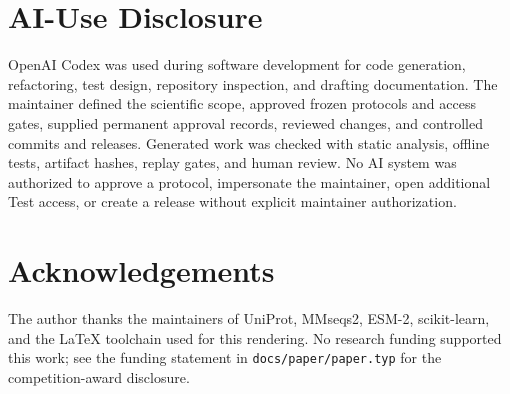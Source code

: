 \documentclass[11pt]{article}
\begin{document}
\section*{AI-Use Disclosure}

OpenAI Codex was used during software development for code generation, refactoring, test design,
repository inspection, and drafting documentation. The maintainer defined the scientific scope,
approved frozen protocols and access gates, supplied permanent approval records, reviewed
changes, and controlled commits and releases. Generated work was checked with static analysis,
offline tests, artifact hashes, replay gates, and human review. No AI system was authorized to
approve a protocol, impersonate the maintainer, open additional Test access, or create a release
without explicit maintainer authorization.

\section*{Acknowledgements}

The author thanks the maintainers of UniProt, MMseqs2, ESM-2, scikit-learn, and the LaTeX
toolchain used for this rendering. No research funding supported this work; see the funding
statement in \texttt{docs/paper/paper.typ} for the competition-award disclosure.



\end{document}
